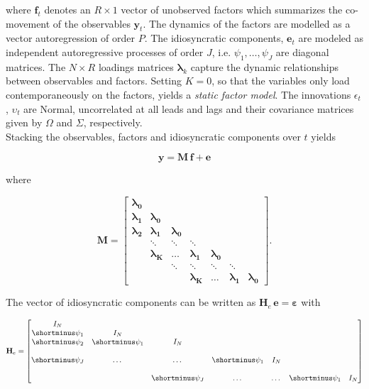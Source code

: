 \documentclass[notitlepage,a4paper,12pt]{article}
\begin{document}
where $\mathbf{f}_t$ denotes an $R \times 1$ vector of unobserved factors which summarizes the co-movement of the observables $\mathbf{y}_t$. The dynamics of the factors are modelled as a vector autoregression of order $P$. The idiosyncratic components, $\mathbf{e}_t$ are modeled as independent autoregressive processes of order $J$, i.e. $\psi_1, \dots, \psi_J$ are diagonal matrices. The $N \times R$ loadings matrices $\mathbf{\lambda}_k$ capture the dynamic relationships between observables and factors. Setting $K=0$, so that the variables only load contemporaneously on the factors, yields a \textit{static factor model}. The innovations $\epsilon_t$, $\upsilon_t$ are Normal, uncorrelated at all leads and lags and their covariance matrices given by $\Omega$ and $\Sigma$, respectively. \\

Stacking the observables, factors and idiosyncratic components over $t$ yields 

\begin{equation}
    \mathbf{y} = \mathbf{M} \, \mathbf{f} + \mathbf{e}
\end{equation} 

\noindent where 

$$
\mathbf{M}
=
\begin{bmatrix}
    \boldsymbol{\lambda_0} &   \\
    \boldsymbol{\lambda_1} & \boldsymbol{\lambda_0}   \\
    \boldsymbol{\lambda_2} & \boldsymbol{\lambda_1} & \boldsymbol{\lambda_0} \\
     & \ddots & \ddots & \ddots \\
     & \boldsymbol{\lambda_K} &\dots & \boldsymbol{\lambda_1} & \boldsymbol{\lambda_0}
     &  \\
     & & \ddots & \ddots & \ddots & \ddots \\
    & & & \boldsymbol{\lambda_K} &\dots & \boldsymbol{\lambda_1} & \boldsymbol{\lambda_0}
\end{bmatrix}.
$$

The vector of idiosyncratic components can be written as $\mathbf{H}_e\, \mathbf{e} = \boldsymbol{\varepsilon}$ with 

$$
\mathbf{H}_e
=
\begin{bmatrix}
    I_N &  \\
    \shortminus \psi_1 & I_N &  \\
    \shortminus \psi_2 & \shortminus \psi_1 & I_N &  \\
     &  &  &  &  & \\
    \shortminus \psi_J & \dots & \dots & \shortminus \psi_1 & I_N \\
     &  &  &  &  & \\
    & & \shortminus \psi_J & \dots & \dots & \shortminus \psi_1 & I_N
\end{bmatrix}
$$
\end{document}
